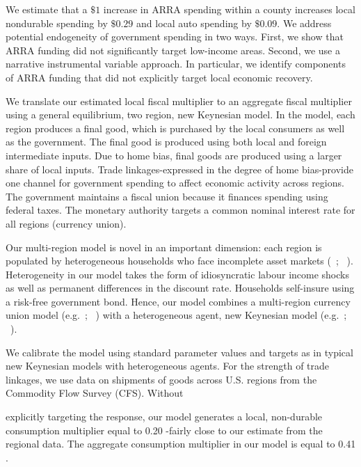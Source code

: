 \documentclass[\latexroot/\projectname]{subfiles}
\begin{document}
We estimate that a $\$ 1$ increase in ARRA spending within a county increases local nondurable spending by $\$ 0.29$ and local auto spending by $\$ 0.09$. We address potential endogeneity of government spending in two ways. First, we show that ARRA funding did not significantly target low-income areas. Second, we use a narrative instrumental variable approach. In particular, we identify components of ARRA funding that did not explicitly target local economic recovery.

We translate our estimated local fiscal multiplier to an aggregate fiscal multiplier using a general equilibrium, two region, new Keynesian model. In the model, each region produces a final good, which is purchased by the local consumers as well as the government. The final good is produced using both local and foreign intermediate inputs. Due to home bias, final goods are produced using a larger share of local inputs. Trade linkages-expressed in the degree of home bias-provide one channel for government spending to affect economic activity across regions. The government maintains a fiscal union because it finances spending using federal taxes. The monetary authority targets a common nominal interest rate for all regions (currency union).

Our multi-region model is novel in an important dimension: each region is populated by heterogeneous households who face incomplete asset markets (~\cite{Huggett1993-ft}; ~\cite{Aiyagari1994-qp}). Heterogeneity in our model takes the form of idiosyncratic labour income shocks as well as permanent differences in the discount rate. Households self-insure using a risk-free government bond. Hence, our model combines a multi-region currency union model (e.g.~\cite{Gali2008-jt}; ~\cite{Nakamura2011-dw}) with a heterogeneous agent, new Keynesian model (e.g.~\cite{McKay2016-si}; ~\cite{Kaplan2018-sr}).

We calibrate the model using standard parameter values and targets as in typical new Keynesian models with heterogeneous agents. For the strength of trade linkages, we use data on shipments of goods across U.S. regions from the Commodity Flow Survey (CFS). Without


explicitly targeting the response, our model generates a local, non-durable consumption multiplier equal to 0.20 -fairly close to our estimate from the regional data. The aggregate consumption multiplier in our model is equal to 0.41 .
\end{document}
